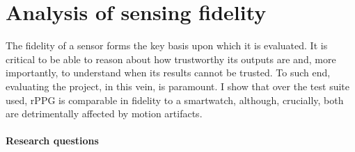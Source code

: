 

\section{Analysis of sensing fidelity}
The fidelity of a sensor forms the key basis upon which it is evaluated. It is critical to be able to reason about how trustworthy its outputs are and, more importantly, to understand
when its results cannot be trusted. To such end, evaluating the project, in this vein, is paramount.
I show that over the test suite used, rPPG is comparable in fidelity to a smartwatch, although, crucially, both are detrimentally affected by motion artifacts.

\paragraph{Research questions}

